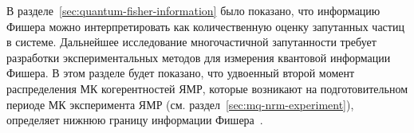 %
%

%
%
%
%
%

%

В разделе~\ref{sec:quantum-fisher-information} было показано,
что информацию Фишера можно интерпретировать как количественную оценку  запутанных частиц в системе.
Дальнейшее исследование многочастичной запутанности требует
разработки экспериментальных методов
для измерения квантовой информации Фишера.
В этом разделе будет показано,
что удвоенный второй момент распределения МК когерентностей ЯМР,
которые возникают на подготовительном периоде МК эксперимента ЯМР
(см. раздел~\ref{sec:mq-nrm-experiment}),
определяет нижнюю границу информации Фишера~\cite{Garttner2018}.

